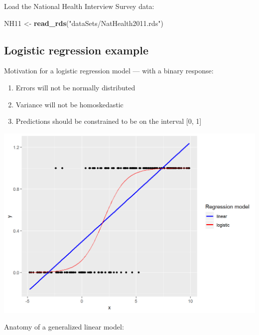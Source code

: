 \documentclass[
]{book}
\newenvironment{Shaded}{\begin{snugshade}}{\end{snugshade}}
\newcommand{\KeywordTok}[1]{\textcolor[rgb]{0.13,0.29,0.53}{\textbf{#1}}}
\newcommand{\NormalTok}[1]{#1}
\newcommand{\StringTok}[1]{\textcolor[rgb]{0.31,0.60,0.02}{#1}}
\providecommand{\tightlist}{%
  \setlength{\itemsep}{0pt}\setlength{\parskip}{0pt}}
\begin{document}
Load the National Health Interview Survey data:

\begin{Shaded}
\begin{Highlighting}[]
\NormalTok{  NH11 \textless{}{-}}\StringTok{ }\KeywordTok{read\_rds}\NormalTok{(}\StringTok{"dataSets/NatHealth2011.rds"}\NormalTok{)}
\end{Highlighting}
\end{Shaded}

\hypertarget{logistic-regression-example}{%
\subsection{Logistic regression example}\label{logistic-regression-example}}

Motivation for a logistic regression model --- with a binary response:

\begin{enumerate}
\def\labelenumi{\arabic{enumi}.}
\tightlist
\item
  Errors will not be normally distributed
\item
  Variance will not be homoskedastic
\item
  Predictions should be constrained to be on the interval {[}0, 1{]}
\end{enumerate}

\includegraphics{R/Rmodels/images/logistic.png}

Anatomy of a generalized linear model:
\end{document}
